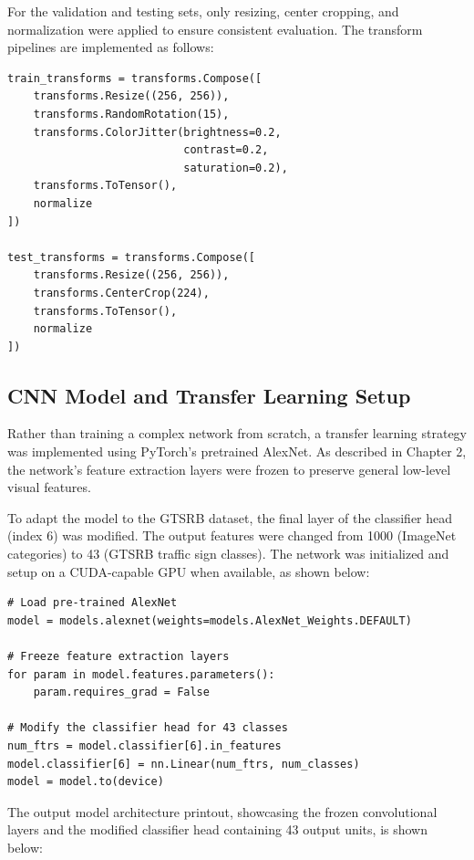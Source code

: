 \documentclass[conference]{IEEEtran}
\begin{document}
For the validation and testing sets, only resizing, center cropping, and normalization were applied to ensure consistent evaluation. The transform pipelines are implemented as follows:

\begin{lstlisting}
train_transforms = transforms.Compose([
    transforms.Resize((256, 256)),
    transforms.RandomRotation(15),
    transforms.ColorJitter(brightness=0.2, 
                           contrast=0.2, 
                           saturation=0.2),
    transforms.ToTensor(),
    normalize
])

test_transforms = transforms.Compose([
    transforms.Resize((256, 256)),
    transforms.CenterCrop(224),
    transforms.ToTensor(),
    normalize
])
\end{lstlisting}

\subsection{CNN Model and Transfer Learning Setup}
Rather than training a complex network from scratch, a transfer learning strategy was implemented using PyTorch's pretrained AlexNet. As described in Chapter 2, the network's feature extraction layers were frozen to preserve general low-level visual features.

To adapt the model to the GTSRB dataset, the final layer of the classifier head (index 6) was modified. The output features were changed from 1000 (ImageNet categories) to 43 (GTSRB traffic sign classes). The network was initialized and setup on a CUDA-capable GPU when available, as shown below:

\begin{lstlisting}
# Load pre-trained AlexNet
model = models.alexnet(weights=models.AlexNet_Weights.DEFAULT)

# Freeze feature extraction layers
for param in model.features.parameters():
    param.requires_grad = False

# Modify the classifier head for 43 classes
num_ftrs = model.classifier[6].in_features
model.classifier[6] = nn.Linear(num_ftrs, num_classes)
model = model.to(device)
\end{lstlisting}

The output model architecture printout, showcasing the frozen convolutional layers and the modified classifier head containing 43 output units, is shown below:
\end{document}
